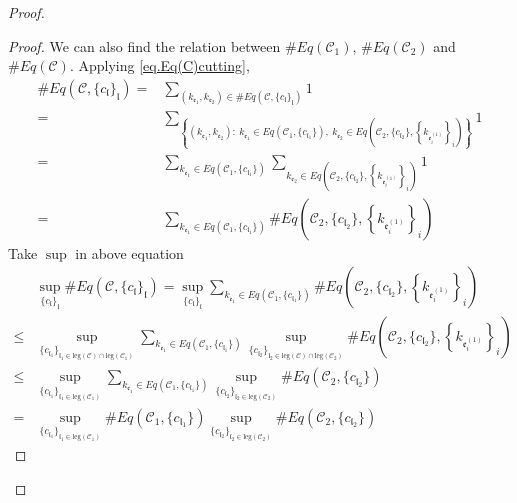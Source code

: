 \begin{proof}
\begin{proof}
We can also find the relation between $\#Eq(\mathcal{C}_1)$, $\#Eq(\mathcal{C}_2)$ and $\#Eq(\mathcal{C})$. Applying \eqref{eq.Eq(C)cutting},
\begin{equation}
\begin{split}
    \#Eq(\mathcal{C},\{c_{\mathfrak{l}}\}_{\mathfrak{l}})=&\sum_{(k_{\mathfrak{e}_1},k_{\mathfrak{e}_{2}})\in \#Eq(\mathcal{C},\{c_{\mathfrak{l}}\}_{\mathfrak{l}})} 1
    \\
    =&\sum_{\left\{(k_{\mathfrak{e}_1},k_{\mathfrak{e}_{2}}):\ k_{\mathfrak{e}_1}\in Eq(\mathcal{C}_1,\{c_{\mathfrak{l}_1}\}),\  k_{\mathfrak{e}_{2}}\in Eq\left(\mathcal{C}_{2}, \{c_{\mathfrak{l}_2}\}, \left\{k_{\mathfrak{e}_{i}^{(1)}}\right\}_{i}\right)\right\}} 1
    \\
    =&\sum_{k_{\mathfrak{e}_1}\in Eq(\mathcal{C}_1,\{c_{\mathfrak{l}_1}\})} \sum_{k_{\mathfrak{e}_{2}}\in Eq\left(\mathcal{C}_{2}, \{c_{\mathfrak{l}_2}\}, \left\{k_{\mathfrak{e}_{i}^{(1)}}\right\}_{i}\right)} 1
    \\
    =&\sum_{k_{\mathfrak{e}_1}\in Eq(\mathcal{C}_1,\{c_{\mathfrak{l}_1}\})} \# Eq\left(\mathcal{C}_{2}, \{c_{\mathfrak{l}_2}\}, \left\{k_{\mathfrak{e}_{i}^{(1)}}\right\}_{i}\right)
\end{split}
\end{equation}
Take $\sup$ in above equation
\begin{equation}
\begin{split}
    &\sup_{\{c_{\mathfrak{l}}\}_{\mathfrak{l}}}\#Eq(\mathcal{C},\{c_{\mathfrak{l}}\}_{\mathfrak{l}})
    =\sup_{\{c_{\mathfrak{l}}\}_{\mathfrak{l}}}\sum_{k_{\mathfrak{e}_1}\in Eq(\mathcal{C}_1,\{c_{\mathfrak{l}_1}\})} \# Eq\left(\mathcal{C}_{2}, \{c_{\mathfrak{l}_2}\}, \left\{k_{\mathfrak{e}_{i}^{(1)}}\right\}_{i}\right)
    \\
    \le &\sup_{\{c_{\mathfrak{l}_1}\}_{\mathfrak{l}_1\in \text{leg}(\mathcal{C})\cap \text{leg}(\mathcal{C}_1)} }\sum_{k_{\mathfrak{e}_1}\in Eq(\mathcal{C}_1,\{c_{\mathfrak{l}_1}\})} \sup_{\{c_{\mathfrak{l}_2}\}_{\mathfrak{l}_2\in \text{leg}(\mathcal{C})\cap \text{leg}(\mathcal{C}_2)} }\# Eq\left(\mathcal{C}_{2}, \{c_{\mathfrak{l}_2}\}, \left\{k_{\mathfrak{e}_{i}^{(1)}}\right\}_{i}\right)
    \\
    \le &\sup_{\{c_{\mathfrak{l}_1}\}_{\mathfrak{l}_1\in \text{leg}(\mathcal{C}_1)} }\sum_{k_{\mathfrak{e}_1}\in Eq(\mathcal{C}_1,\{c_{\mathfrak{l}_1}\})} \sup_{\{c_{\mathfrak{l}_2}\}_{\mathfrak{l}_2\in \text{leg}(\mathcal{C}_2)} }\# Eq(\mathcal{C}_{2}, \{c_{\mathfrak{l}_2}\})
    \\
    = &\sup_{\{c_{\mathfrak{l}_1}\}_{\mathfrak{l}_1\in \text{leg}(\mathcal{C}_1)} } \# Eq(\mathcal{C}_1,\{c_{\mathfrak{l}_1}\}) \sup_{\{c_{\mathfrak{l}_2}\}_{\mathfrak{l}_2\in \text{leg}(\mathcal{C}_2)} }\# Eq(\mathcal{C}_{2}, \{c_{\mathfrak{l}_2}\})
\end{split}
\end{equation}


\end{proof}
\end{proof}
